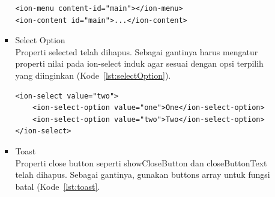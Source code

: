 \begin{enumerate}
\begin{itemize}
\begin{itemize}
			\begin{lstlisting}[label={lst:menu}, caption=Kode Program untuk Menu]
<ion-menu content-id="main"></ion-menu>
<ion-content id="main">...</ion-content>
			\end{lstlisting}
			\item Select Option \\
			Properti selected telah dihapus. Sebagai gantinya harus mengatur properti nilai pada ion-select induk agar sesuai dengan opsi terpilih yang diinginkan (Kode~\ref{lst:selectOption}).
			\begin{lstlisting}[label={lst:selectOption}, caption=Kode Program untuk Select Option]
<ion-select value="two">
	<ion-select-option value="one">One</ion-select-option>
	<ion-select-option value="two">Two</ion-select-option>
</ion-select>
			\end{lstlisting}
			
			\item Toast \\
			Properti close button seperti showCloseButton dan closeButtonText telah dihapus. Sebagai gantinya, gunakan buttons array untuk fungsi batal (Kode~\ref{lst:toast}.


\end{itemize}
\end{itemize}
\end{enumerate}
